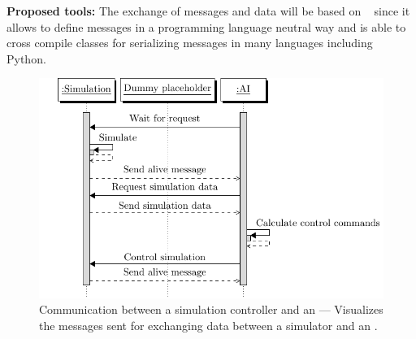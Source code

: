 {\bfseries Proposed tools:} The exchange of messages and data will be based on \protobuf~\cite{protobuf} since it allows to define messages in a programming language neutral way and is able to cross compile classes for serializing messages in many languages including Python.
\begin{figure}
    \centering
    \caption{Communication between a simulation controller and an  --- Visualizes the messages sent for exchanging data between a simulator and an .}\label{fig:aiSimProtocol}
    \medskip
    \includegraphics[page=1]{pictures/aiSimCommunication.pdf}
\end{figure}

